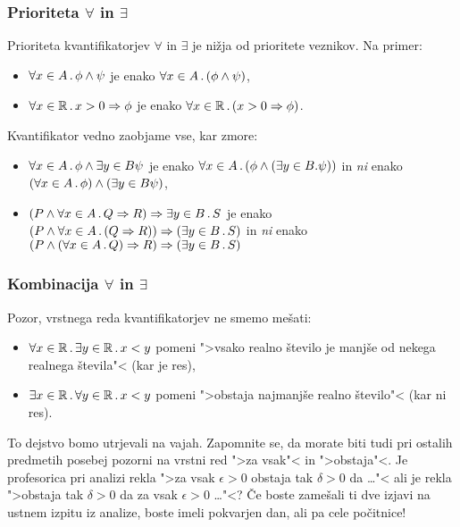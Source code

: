 \subsubsection{Prioriteta $\forall$ in $\exists$}

Prioriteta kvantifikatorjev $\forall$ in $\exists$ je nižja od prioritete veznikov. Na primer:
%
\begin{itemize}
\item $\forall x \in A \,.\, \phi \land \psi$ je enako $\forall x \in A \,.\, (\phi \land \psi)$,
\item $\forall x \in \mathbb{R} \,.\, x > 0 \Rightarrow \phi$ je enako $\forall x \in \mathbb{R} \,.\, (x > 0 \Rightarrow \phi)$.
\end{itemize}
% 
Kvantifikator vedno zaobjame vse, kar zmore:
%
\begin{itemize}
\item $\forall x \in A \,.\, \phi \land \exists{y \in B} \psi$ je enako $\forall x \in A \,.\, (\phi \land (\exists y \in B . \psi))$ in \emph{ni} enako $(\forall x \in A \,.\, \phi) \land (\exists {y \in B} \psi)$,

\item $(P \land \forall x \in A \,.\, Q \Rightarrow R) \Rightarrow \exists y \in B \,.\, S$ je enako $(P \land \forall x \in A \,.\,  (Q \Rightarrow R)) \Rightarrow (\exists y \in B \,.\, S)$ in \emph{ni} enako 
  $(P \land (\forall x \in A \,.\, Q) \Rightarrow R) \Rightarrow (\exists y \in B \,.\, S)$
\end{itemize}

\subsubsection{Kombinacija $\forall$ in $\exists$}

Pozor, vrstnega reda kvantifikatorjev ne smemo mešati:
%
\begin{itemize}
\item $\forall x \in \mathbb{R} \,.\, \exists y \in \mathbb{R} \,.\, x < y$ pomeni ">vsako realno število je manjše od nekega realnega števila"< (kar je res),
\item $\exists x \in \mathbb{R} \,.\, \forall y \in \mathbb{R} \,.\, x < y$ pomeni ">obstaja najmanjše realno število"< (kar ni res).
\end{itemize}
%
To dejstvo bomo utrjevali na vajah. Zapomnite se, da morate biti tudi pri ostalih predmetih posebej pozorni na vrstni red
">za vsak"< in ">obstaja"<. Je profesorica pri analizi rekla ">za vsak $\epsilon > 0$ obstaja tak $\delta > 0$ da \dots"< ali je rekla ">obstaja tak $\delta > 0$ da za vsak $\epsilon > 0$ \dots"<? Če boste zamešali ti dve izjavi na ustnem izpitu iz analize, boste imeli pokvarjen dan, ali pa cele počitnice!


